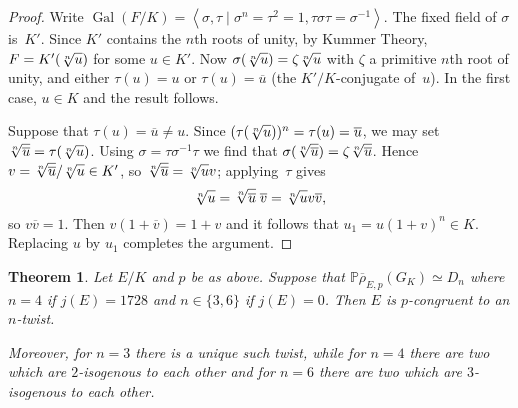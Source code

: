 \documentclass[12pt, reqno]{amsart}
\newcommand{\PP}{\mathbb{P}}
\newcommand{\rhobar}{{\overline{\rho}}}
\DeclareMathOperator{\Gal}{Gal}
\numberwithin{equation}{section}
\newtheorem{theorem}{Theorem}[section]
\theoremstyle{definition}
\theoremstyle{remark}
\begin{document}
\begin{proof}\label{L:Dn}
Write $\Gal(F/K)=\left<\sigma,\tau\mid\sigma^n=\tau^2=1,
\tau\sigma\tau=\sigma^{-1}\right>$.  The fixed field of $\sigma$
is~$K'$.  Since $K'$ contains the $n$th roots of unity, by Kummer
Theory, $F=K'(\rnu)$ for some $u\in K'$.  Now $\sigma(\rnu)=\zeta\rnu$
with $\zeta$ a primitive $n$th root of unity, and either $\tau(u)=u$
or $\tau(u)=\overline{u}$ (the $K'/K$-conjugate of~$u$).  In the first
case, $u\in K$ and the result follows.

Suppose that $\tau(u)=\overline{u}\not=u$.  Since
$(\tau(\rnu))^n=\tau(u)=\overline{u}$, we may set $\rnub=\tau(\rnu)$.
Using $\sigma=\tau\sigma^{-1}\tau$ we find that
$\sigma(\rnub)=\zeta\rnub$.  Hence $v=\rnub/\rnu\in K'$, so
$\rnub=\rnu v$;  applying~$\tau$ gives
\[
\rnu = \rnub\;\overline{v} = \rnu v\overline{v},
\]
so $v\overline{v}=1$.  Then $v(1+\overline{v})=1+v$ and it follows
that $u_1=u(1+v)^n\in K$.  Replacing $u$ by $u_1$ completes the
argument.
\end{proof}


\begin{theorem} \label{T:higherTwists}
Let $E/K$ and $p$ be as above. Suppose that $\PP \rhobar_{E,p}(G_K) \simeq D_n$ where $n=4$ if
$j(E)=1728$ and $n\in\{3,6\}$ if $j(E)=0$.
Then $E$ is $p$-congruent to an $n$-twist.  

Moreover, for $n=3$ there is a
unique such twist, while for $n=4$ there are two which are
$2$-isogenous to each other and for $n=6$ there are two which are
$3$-isogenous to each other.
\end{theorem}
\end{document}
